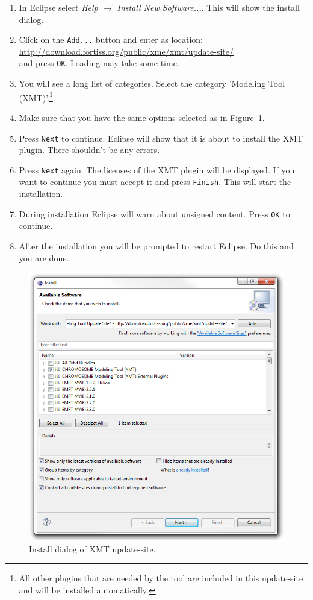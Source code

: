 \begin{enumerate}
	\item In Eclipse select \textit{Help $\rightarrow$ Install New Software...}. This will show the install dialog. 
	\item Click on the \texttt{Add...} button and enter as location:\\
\url{http://download.fortiss.org/public/xme/xmt/update-site/}\\
and press \texttt{OK}. Loading may take some time.
	\item You will see a long list of categories. Select the category '\xme Modeling Tool (XMT)'.\footnote{%
		All other plugins that are needed by the tool are included in this update-site and will be installed automatically.
	}
	\item Make sure that you have the same options selected as in Figure~\ref{fig:xmt_update-site.png}.
	\item Press \texttt{Next} to continue. Eclipse will show that it is about to install the XMT plugin. There shouldn't be any errors.
	\item Press \texttt{Next} again. The licenses of the XMT plugin will be displayed.
If you want to continue you must accept it and press \texttt{Finish}. This will start the installation.
	\item During installation Eclipse will warn about unsigned content. Press \texttt{OK} to continue.
	\item After the installation you will be prompted to restart Eclipse. Do this and you are done.
\end{enumerate}

\begin{figure}[htpb]
	\centering
	\includegraphics[scale=0.5]{figures/xmt_update-site.png}
	\caption{Install dialog of XMT update-site.}
	\label{fig:xmt_update-site.png}
\end{figure}

